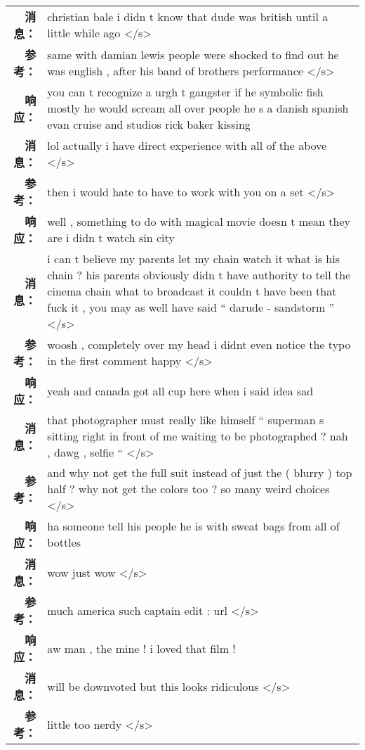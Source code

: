 \begin{tabularx}{\textwidth}{@{}rX@{}}%
\toprule%
\midrule%
\textbf{消息：}&christian bale i didn t know that dude was british until a little while ago </s>\\%
\textbf{参考：}&same with damian lewis people were shocked to find out he was english , after his band of brothers performance </s>\\%
\textbf{响应：}&you can t recognize a urgh t gangster if he symbolic fish mostly he would scream all over people he s a danish spanish evan cruise and studios rick baker kissing\\%
\midrule%
\textbf{消息：}&lol actually i have direct experience with all of the above </s>\\%
\textbf{参考：}&then i would hate to have to work with you on a set </s>\\%
\textbf{响应：}&well , something to do with magical movie doesn t mean they are i didn t watch sin city\\%
\midrule%
\textbf{消息：}&i can t believe my parents let my chain watch it what is his chain ? his parents obviously didn t have authority to tell the cinema chain what to broadcast it couldn t have been that fuck it , you may as well have said `` darude {-} sandstorm '' </s>\\%
\textbf{参考：}&woosh , completely over my head i didnt even notice the typo in the first comment happy </s>\\%
\textbf{响应：}&yeah and canada got all cup here when i said idea sad\\%
\midrule%
\textbf{消息：}&that photographer must really like himself `` superman s sitting right in front of me waiting to be photographed ? nah , dawg , selfie `` </s>\\%
\textbf{参考：}&and why not get the full suit instead of just the ( blurry ) top half ? why not get the colors too ? so many weird choices </s>\\%
\textbf{响应：}&ha someone tell his people he is with sweat bags from all of bottles\\%
\midrule%
\textbf{消息：}&wow just wow </s>\\%
\textbf{参考：}&much america such captain edit : url </s>\\%
\textbf{响应：}&aw man , the mine ! i loved that film !\\%
\midrule%
\textbf{消息：}&will be downvoted but this looks ridiculous </s>\\%
\textbf{参考：}&little too nerdy </s>\\%

\end{tabularx}
